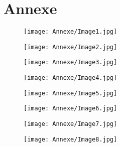 \chapter*{Annexe} 


    \begin{figure}[H]
   \centering
   \texttt{[image: Annexe/Image1.jpg]}
	\caption{\cite{realsoc}}\label{fig:realsoc}
    \end{figure}


    \begin{figure}[H]
   \centering
   \texttt{[image: Annexe/Image2.jpg]}
	\caption{\cite{courbetcommunard}}\label{fig:commune}
    \end{figure}


    \begin{figure}[H]
   \centering
   \texttt{[image: Annexe/Image3.jpg]}
	\caption{\cite{baudelairepeintres}}\label{fig:baudelaire}
    \end{figure}


    \begin{figure}[H]
   \centering
   \texttt{[image: Annexe/Image4.jpg]}
	\caption{\cite{pabloneruda}}\label{fig:neruda}
    \end{figure}


    \begin{figure}[H]
   \centering
   \texttt{[image: Annexe/Image5.jpg]}
	\caption{\cite{nouvelleformule}}\label{fig:formule}
    \end{figure}


    \begin{figure}[H]
   \centering
   \texttt{[image: Annexe/Image6.jpg]}
	\caption{\cite{journallimbour}}\label{fig:journallimbour}
    \end{figure}


    \begin{figure}[H]
   \centering
   \texttt{[image: Annexe/Image7.jpg]}
	\caption{\cite{pabloneruda}}\label{fig:neruda2}
    \end{figure}


    \begin{figure}[H]
   \centering
   \texttt{[image: Annexe/Image8.jpg]}
	\caption{\cite{atraversgaleries}}\label{fig:galeries}
    \end{figure}


